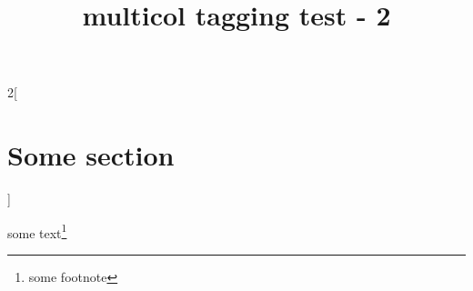 \documentclass{article}
\title{multicol tagging test - 2}
\begin{document}
\setlength{\columnseprule}{1pt}
\begin{multicols}{2}[\section{Some section}]
\kant[1-2]

some text\footnote{some footnote}
\end{multicols}
\end{document}
